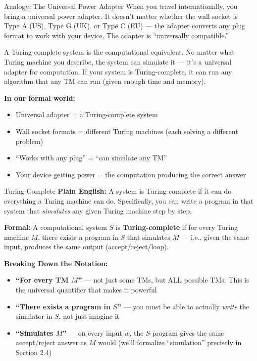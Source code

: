 \begin{notebox}{Analogy: The Universal Power Adapter}
When you travel internationally, you bring a universal power adapter. It
doesn't matter whether the wall socket is Type A (US), Type G (UK), or Type C
(EU) --- the adapter converts any plug format to work with your device. The
adapter is ``universally compatible.''

A Turing-complete system is the computational equivalent. No matter what Turing
machine you describe, the system can simulate it --- it's a universal adapter
for computation. If your system is Turing-complete, it can run any algorithm
that any TM can run (given enough time and memory).

\textbf{In our formal world:}
\begin{itemize}[nosep]
\item Universal adapter = a Turing-complete system
\item Wall socket formats = different Turing machines (each solving a different problem)
\item ``Works with any plug'' = ``can simulate any TM''
\item Your device getting power = the computation producing the correct answer
\end{itemize}
\end{notebox}

\begin{definitionbox}{Turing-Complete}
\textbf{Plain English:}
A system is Turing-complete if it can do everything a Turing machine can do.
Specifically, you can write a program in that system that \emph{simulates} any
given Turing machine step by step.

\textbf{Formal:}
A computational system $S$ is \textbf{Turing-complete} if for every Turing
machine $M$, there exists a program in $S$ that simulates $M$ --- i.e., given
the same input, produces the same output (accept/reject/loop).

\textbf{Breaking Down the Notation:}
\begin{itemize}[nosep]
\item \textbf{``For every TM $M$''} --- not just some TMs, but ALL possible TMs.
  This is the universal quantifier that makes it powerful
\item \textbf{``There exists a program in $S$''} --- you must be able to
  actually \emph{write} the simulator in $S$, not just imagine it
\item \textbf{``Simulates $M$''} --- on every input $w$, the $S$-program gives
  the same accept/reject answer as $M$ would (we'll formalize ``simulation''
  precisely in Section 2.4)
\end{itemize}
\end{definitionbox}

